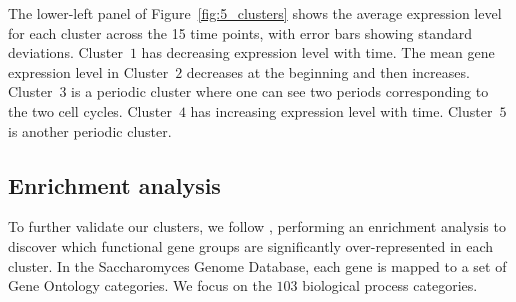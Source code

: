 \documentclass[12pt]{article}
\begin{document}
The lower-left panel of Figure~\ref{fig:5_clusters} shows the average
expression level for each cluster across the 15 time points, with error bars
showing standard deviations. Cluster~$1$ has decreasing expression level with
time. The mean gene expression level in Cluster~$2$ decreases at the beginning
and then increases. Cluster~$3$ is a periodic cluster where one can see two
periods corresponding to the two cell cycles. Cluster~$4$ has increasing
expression level with time.  Cluster~$5$ is another periodic cluster. 



\subsection{Enrichment analysis}

To further validate our clusters, we follow \citet{tavazoie1999systematic},
performing an enrichment analysis to discover which functional gene groups are
significantly over-represented in each cluster. In the Saccharomyces Genome
Database, each gene is mapped to a set of Gene Ontology categories. We focus
on the $103$ biological process categories.
\end{document}
